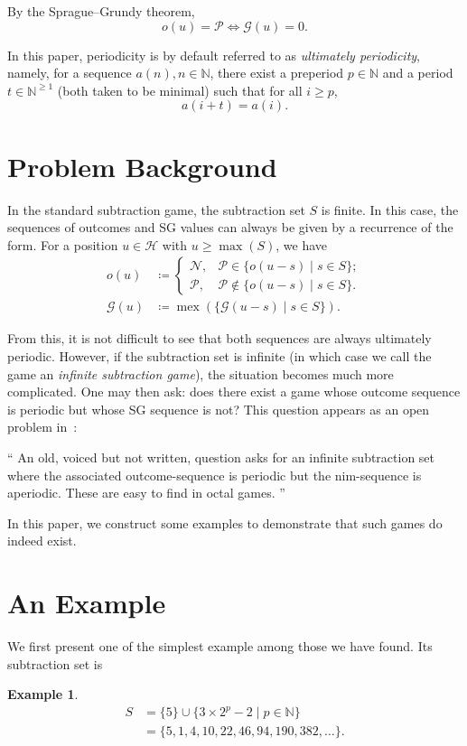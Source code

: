 \documentclass[11pt]{article}
\theoremstyle{definition}
\newtheorem{example}{Example}[section]
\theoremstyle{plain}
\newcommand{\mex}{\operatorname{mex}}
\begin{document}
By the Sprague--Grundy theorem,
\[
    o(u) = \mathcal{P} \iff \mathcal{G}(u) = 0.
\]

In this paper, periodicity is by default referred to as \textit{ultimately periodicity},
namely, for a sequence \(a(n), n\in\mathbb{N}\), there exist a preperiod \(p\in\mathbb{N}\) and a period \(t\in\mathbb{N}^{\geq 1}\) (both taken to be minimal) such that for all \(i \geq p\),
\[
    a(i+t)=a(i).
\]

\section{Problem Background}

In the standard subtraction game, the subtraction set $S$ is finite.
In this case, the sequences of outcomes and SG values can always be given by a recurrence of the form.
For a position $u\in\mathcal{H}$ with $u\geq \max(S)$, we have
\begin{align*}
    o(u) &\coloneq
    \begin{cases}
        \mathcal{N}, & \mathcal{P}\in \{o(u-s) \mid s\in S\}; \\
        \mathcal{P}, & \mathcal{P}\notin \{o(u-s) \mid s\in S\}.
    \end{cases} \\
    \mathcal{G}(u) &\coloneq \mex(\{ \mathcal{G}(u-s) \mid s\in S \}).
\end{align*}

From this, it is not difficult to see that both sequences are always ultimately periodic.
However, if the subtraction set is infinite (in which case we call the game an \textit{infinite subtraction game}), the situation becomes much more complicated.
One may then ask: does there exist a game whose outcome sequence is periodic but whose SG sequence is not?
This question appears as an open problem in~\cite{GONC6}:

``
    An old, voiced but not written, question asks for an infinite subtraction set where the associated outcome-sequence is periodic but the nim-sequence is aperiodic.
    These are easy to find in octal games.
''

In this paper, we construct some examples to demonstrate that such games do indeed exist.

\section{An Example}

We first present one of the simplest example among those we have found.
Its subtraction set is
\begin{example}\label{S_e1}
    \begin{align*}
        S &= \{5\} \cup \{3 \times 2^p - 2 \mid p\in\mathbb{N}\} \\
          &= \{5, 1, 4, 10, 22, 46, 94, 190,382, \ldots\}.
    \end{align*}
\end{example}
\end{document}
